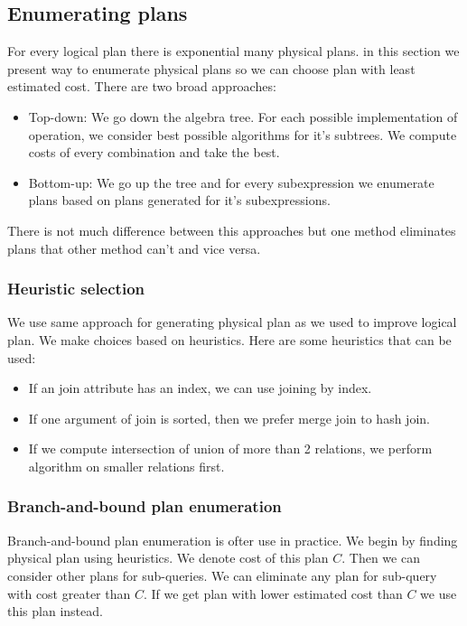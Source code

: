 \subsection{Enumerating plans}
For every logical plan there is exponential many physical plans. in this section we present way to enumerate physical plans so we can choose plan with least estimated cost. There are two broad approaches:
\begin{itemize}
\item Top-down: We go down the algebra tree. For each possible implementation of operation, we consider best possible algorithms for it's subtrees. We compute costs of every combination and take the best.
\item Bottom-up: We go up the tree and for every subexpression we enumerate plans based on plans generated for it's subexpressions.
\end{itemize}

There is not much difference between this approaches but one method eliminates plans that other method can't and vice versa.
\subsubsection{Heuristic selection}

We use same approach for generating physical plan as we used to improve logical plan. We make choices based on heuristics. Here are some heuristics that can be used:

\begin{itemize}

\item If an join attribute has an index, we can use joining by index.
\item If one argument of join is sorted, then we prefer merge join to hash join.
\item If we compute intersection of union of more than 2 relations, we perform algorithm on smaller relations first.
\end{itemize}

\subsubsection{Branch-and-bound plan enumeration}
Branch-and-bound plan enumeration is ofter use in practice. We begin by finding physical plan using heuristics. We denote cost of this plan $C$. Then we can consider other plans for sub-queries. We can eliminate any plan for sub-query with cost greater than $C$. If we get plan with lower estimated cost than $C$ we use this plan instead.

